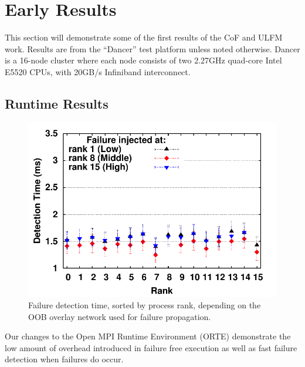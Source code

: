 \section{Early Results}\label{sect:results}

This section will demonstrate some of the first results of the CoF and ULFM
work.  Results are from the ``Dancer'' test platform unless noted otherwise.
Dancer is a 16-node cluster where each node consists of two 2.27GHz quad-core
Intel E5520 CPUs, with 20GB/s Infiniband interconnect.

\subsection{Runtime Results}\label{subsect:runtime-results}

\begin{figure}
    \centering
        \includegraphics[width=\linewidth]{figures/failure-detection-binomial-errbars}
        \caption{Failure detection time, sorted by process rank, depending on the
        OOB overlay network used for failure propagation.}
        \label{fig:binomial-detection}
\end{figure}

Our changes to the Open MPI Runtime Environment (ORTE) demonstrate the low
amount of overhead introduced in failure free execution as well as fast failure
detection when failures do occur.

